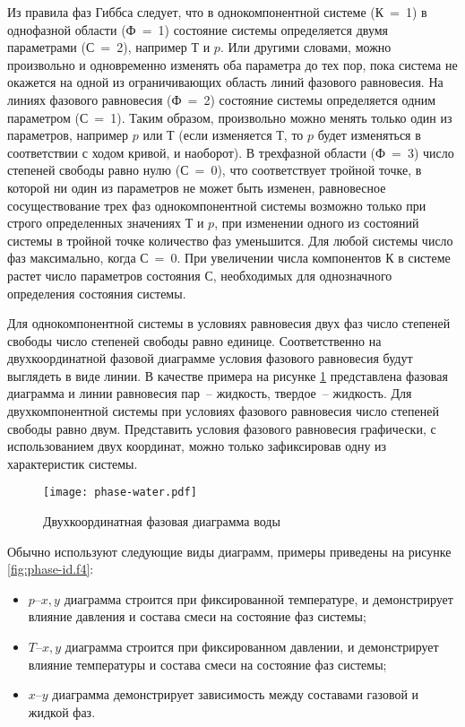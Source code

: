 Из правила фаз Гиббса следует, что в однокомпонентной системе ($К$ = 1) в однофазной области ($Ф$ = 1) состояние системы определяется двумя параметрами ($С$ = 2), например $Т$ и $p$.  Или другими словами, можно произвольно и одновременно изменять оба параметра до тех пор, пока система не окажется на одной из ограничивающих область линий фазового равновесия. На линиях фазового равновесия ($Ф$ = 2) состояние системы определяется одним параметром ($С$ = 1). Таким образом, произвольно можно менять только один из параметров, например $p$ или $Т$ (если изменяется $Т$, то $p$ будет изменяться в соответствии с ходом кривой, и наоборот). В трехфазной области ($Ф$ = 3) число степеней свободы равно нулю ($С$ = 0), что соответствует тройной точке, в которой ни один из параметров не может быть изменен, равновесное сосуществование трех фаз однокомпонентной системы возможно только при строго определенных значениях $Т$ и $p$, при изменении одного из состояний системы в тройной точке количество фаз уменьшится. Для любой системы число фаз максимально, когда $С$ = 0. При увеличении числа компонентов $К$ в системе растет число параметров состояния $С$, необходимых для однозначного определения состояния системы.

Для однокомпонентной системы в условиях равновесия двух фаз число степеней свободы число степеней свободы равно единице. Соответственно на двухкоординатной фазовой диаграмме условия фазового равновесия будут выглядеть в виде линии. В качестве примера на рисунке \ref{fig:phase-id.f1} представлена фазовая диаграмма и линии равновесия пар~-- жидкость, твердое~-- жидкость. Для двухкомпонентной системы при условиях фазового равновесия число степеней свободы равно двум. Представить условия фазового равновесия графически, с использованием двух координат, можно только зафиксировав одну из характеристик системы. 
\begin{figure}
	\begin{center}
		\texttt{[image: phase-water.pdf]}
	\end{center}
	\caption{Двухкоординатная фазовая диаграмма воды} \label{fig:phase-id.f1}
\end{figure}

Обычно используют следующие виды диаграмм, примеры приведены на рисунке \ref{fig:phase-id.f4}:
\begin{itemize}
	\item $p – x,y$ диаграмма строится при фиксированной температуре, и демонстрирует влияние давления и состава смеси на состояние фаз системы; 
	\item $T – x,y$ диаграмма строится при фиксированном давлении, и демонстрирует влияние температуры и состава смеси на состояние фаз системы;
	\item $x – y$ диаграмма демонстрирует зависимость между составами газовой и жидкой фаз.	
\end{itemize} 



